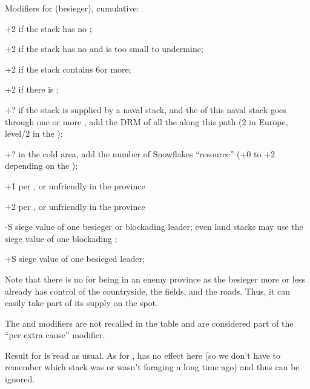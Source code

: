 Modifiers for  (besieger), cumulative:
\begin{modlist}
\item[+2] if the stack has no \LoS;
\item[+2] if the stack has no \LoS and is too small to undermine;
\item[+2] if the stack contains 6\LD or more;
\item[+2] if there is ;
\item[+?] if the stack is supplied by a naval stack, and the \LoS of this
  naval stack goes through one or more \StraitFort, add the DRM of all the
  \StraitFort along this path (2 in Europe, level/2 in the \ROTW);
\item[+?] in the \ROTW cold area, add the number of Snowflakes ``resource''
  (+0 to +2 depending on the \Area);
\item[+1] per \PILLAGE\facemoins, \REVOLT\facemoins or unfriendly
  \REBELLION\facemoins in the province
\item[+2] per \PILLAGE\faceplus, \REVOLT\faceplus or unfriendly
  \REBELLION\faceplus in the province
\item[-S] siege value of one besieger or blockading leader; even land stacks
  may use the siege value of one blockading \LeaderA;
\item[+S] siege value of one besieged leader;
\end{modlist}

Note that there is no  for being in an enemy province as the
besieger more or less already has control of the countryside, the fields,
and the roads. Thus, it can easily take part of its supply on the spot.

The  and  modifiers are not recalled in
the table and are considered part of the ``per extra cause'' modifier.

Result for  is read as usual. As for ,  has no effect here (so we don't have to
remember which stack was or wasn't foraging a long time ago) and thus can be
ignored.

